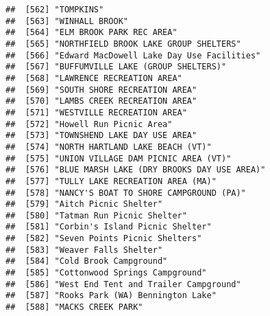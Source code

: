 \documentclass[
]{article}
\begin{document}
\begin{verbatim}
##  [562] "TOMPKINS"                                                                            
##  [563] "WINHALL BROOK"                                                                       
##  [564] "ELM BROOK PARK REC AREA"                                                             
##  [565] "NORTHFIELD BROOK LAKE GROUP SHELTERS"                                                
##  [566] "Edward MacDowell Lake Day Use Facilities"                                            
##  [567] "BUFFUMVILLE LAKE (GROUP SHELTERS)"                                                   
##  [568] "LAWRENCE RECREATION AREA"                                                            
##  [569] "SOUTH SHORE RECREATION AREA"                                                         
##  [570] "LAMBS CREEK RECREATION AREA"                                                         
##  [571] "WESTVILLE RECREATION AREA"                                                           
##  [572] "Howell Run Picnic Area"                                                              
##  [573] "TOWNSHEND LAKE DAY USE AREA"                                                         
##  [574] "NORTH HARTLAND LAKE BEACH (VT)"                                                      
##  [575] "UNION VILLAGE DAM PICNIC AREA (VT)"                                                  
##  [576] "BLUE MARSH LAKE (DRY BROOKS DAY USE AREA)"                                           
##  [577] "TULLY LAKE RECREATION AREA (MA)"                                                     
##  [578] "NANCY'S BOAT TO SHORE CAMPGROUND (PA)"                                               
##  [579] "Aitch Picnic Shelter"                                                                
##  [580] "Tatman Run Picnic Shelter"                                                           
##  [581] "Corbin's Island Picnic Shelter"                                                      
##  [582] "Seven Points Picnic Shelters"                                                        
##  [583] "Weaver Falls Shelter"                                                                
##  [584] "Cold Brook Campground"                                                               
##  [585] "Cottonwood Springs Campground"                                                       
##  [586] "West End Tent and Trailer Campground"                                                
##  [587] "Rooks Park (WA) Bennington Lake"                                                     
##  [588] "MACKS CREEK PARK"                                                                    

\end{verbatim}
\end{document}
